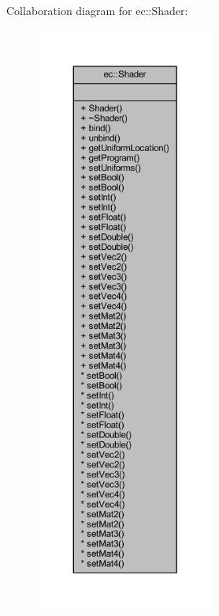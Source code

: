 Collaboration diagram for ec\+:\+:Shader\+:\nopagebreak
\begin{figure}[H]
\begin{center}
\leavevmode
\includegraphics[height=550pt]{classec_1_1_shader__coll__graph}
\end{center}
\end{figure}
